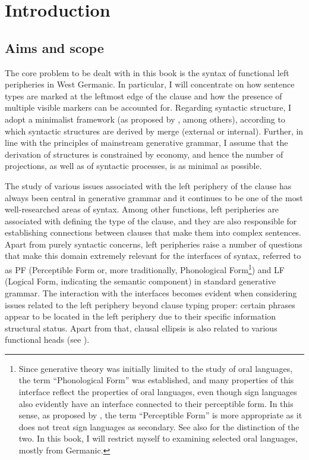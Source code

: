 \chapter{Introduction} \label{ch:1}
\section{Aims and scope} \label{sec:1aims}
The core problem to be dealt with in this book is the syntax of functional left peripheries in West Germanic. In particular, I will concentrate on how sentence types are marked at the leftmost edge of the clause and how the presence of multiple visible markers can be accounted for. Regarding syntactic structure, I adopt a minimalist framework (as proposed by \citealt{chomsky2001, chomsky2004, chomsky2008}, among others), according to which syntactic structures are derived by merge (external or internal). Further, in line with the principles of mainstream generative grammar, I assume that the derivation of structures is constrained by economy, and hence the number of projections, as well as of syntactic processes, is as minimal as possible.

The study of various issues associated with the left periphery of the clause has always been central in generative grammar and it continues to be one of the most well-researched areas of syntax. Among other functions, left peripheries are associated with defining the type of the clause, and they are also responsible for establishing connections between clauses that make them into complex sentences. Apart from purely syntactic concerns, left peripheries raise a number of questions that make this domain extremely relevant for the interfaces of syntax, referred to as PF (Perceptible Form or, more traditionally, Phonological Form\footnote{Since generative theory was initially limited to the study of oral languages, the term ``Phonological Form'' was established, and many properties of this interface reflect the properties of oral languages, even though sign languages also evidently have an interface connected to their perceptible form. In this sense, as proposed by \citet{sigurdsson2004}, the term ``Perceptible Form'' is more appropriate as it does not treat sign languages as secondary. See also \citet{vanderhulst2015} for the distinction of the two. In this book, I will restrict myself to examining selected oral languages, mostly from Germanic.}) and LF (Logical Form, indicating the semantic component) in standard generative grammar. The interaction with the interfaces becomes evident when considering issues related to the left periphery beyond clause typing proper: certain phrases appear to be located in the left periphery due to their specific information structural status. Apart from that, clausal ellipsis is also related to various functional heads (see \citealt{merchant2001}).

